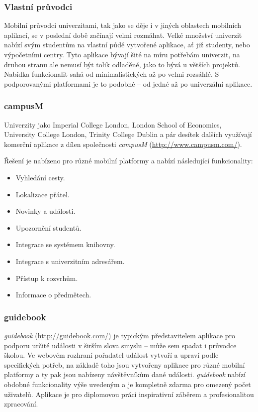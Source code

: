 \subsubsection{Vlastní průvodci}
Mobilní průvodci univerzitami, tak jako se děje i v jiných oblastech mobilních aplikací, se v poslední době začínají velmi rozmáhat. Velké množství univerzit nabízí svým studentům na vlastní půdě vytvořené aplikace, ať již studenty, nebo výpočetními centry. Tyto aplikace bývají šité na míru potřebám univerzit, na druhou stranu ale nemusí být tolik odladěné, jako to bývá u větších projektů. Nabídka funkcionalit sahá od minimalistických až po velmi rozsáhlé. S podporovanými platformami je to podobné -- od jedné až po univerzální aplikace.

\subsubsection{campusM}
Univerzity jako Imperial College London, London School of Economics, University College London, Trinity College Dublin a pár desítek dalších využívají komerční aplikace z dílen společnosti \emph{campusM} (\url{http://www.campusm.com/}).

Řešení je nabízeno pro různé mobilní platformy a nabízí následující funkcionality:
\begin{itemize}
\item Vyhledání cesty.
\item Lokalizace přátel.
\item Novinky a události.
\item Upozornění studentů.
\item Integrace se systémem knihovny.
\item Integrace s univerzitním adresářem.
\item Přístup k rozvrhům.
\item Informace o předmětech.
\end{itemize}

\subsubsection{guidebook}
\emph{guidebook} (\url{http://guidebook.com/}) je typickým představitelem aplikace pro podporu určité události v širším slova smyslu -- může sem spadat i průvodce školou. Ve webovém rozhraní pořadatel událost vytvoří a upraví podle specifických potřeb, na základě toho jsou vytvořeny aplikace pro různé mobilní platformy a ty pak jsou nabízeny návštěvníkům dané události. \textit{guidebook} nabízí obdobné funkcionality výše uvedeným a je kompletně zdarma pro omezený počet uživatelů. Aplikace je pro diplomovou práci inspirativní záběrem a profesionalitou zpracování.

